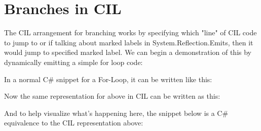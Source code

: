\newpage

\section{Branches in CIL}

The CIL arrangement for branching works by specifying which "line" of CIL code to jump to or if talking about marked labels in System.Reflection.Emits, then it would jump to specified marked label. We can begin a demonstration of this by dynamically emitting a simple for loop code:

In a normal C\# snippet for a For-Loop, it can be written like this:



Now the same representation for above in CIL can be written as this:



And to help visualize what's happening here, the snippet below is a C\# equivalence to the CIL representation above:


